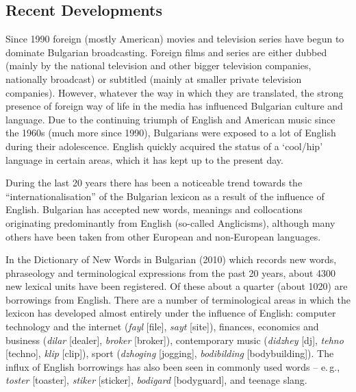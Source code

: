 \begin{multicols}{2}
  \subsection{Recent Developments}

  Since 1990 foreign (mostly American) movies and television series have begun to dominate Bulgarian broadcasting. Foreign films and series are either dubbed (mainly by the national television and other bigger television companies, nationally broadcast) or subtitled (mainly at smaller private television companies). However, whatever the way in which they are translated, the strong presence of foreign way of life in the media has influenced Bulgarian culture and language. Due to the continuing triumph of English and American music since the 1960s (much more since 1990), Bulgarians were exposed to a lot of English during their adolescence. English quickly acquired the status of a ‘cool/hip’ language in certain areas, which it has kept up to the present day. 

  During the last 20 years there has been a noticeable trend towards the ``internationalisation'' of the Bulgarian lexicon as a result of the influence of English. Bulgarian has accepted new words, meanings and collocations originating predominantly from English (so-called Anglicisms), although many others have been taken from other European and non-European languages.


  In the Dictionary of New Words in Bulgarian (2010)  \cite{NWDict} which records new words, phraseology and terminological expressions from the past 20 years, about 4300 new lexical units have been registered. Of these about a quarter (about 1020) are borrowings from English. There are a number of terminological areas in which the lexicon has developed almost entirely under the influence of English: computer technology and the internet (\textit{{fayl}} [file], \textit{{sayt}} [site]), finances, economics and business (\textit{{dilar}} [dealer], \textit{{broker}} [broker]), contemporary music (\textit{{didzhey}} [dj], \textit{{tehno}} [techno], \textit{{klip}} [clip]), sport (\textit{{dzhoging}} [jogging], \textit{{bodibilding}} [bodybuilding]). The influx of English borrowings has also been seen in commonly used words -- e.\,g., \textit{{toster}} [toaster], \textit{{stiker}} [sticker], \textit{{bodigard}} [bodyguard], and teenage slang.


\end{multicols}
